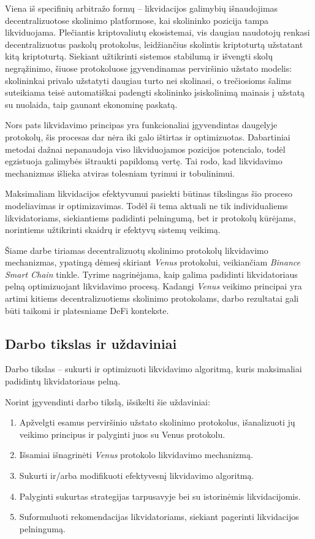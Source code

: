 \documentclass[]{VUMIFTemplateClass}
\begin{document}
Viena iš specifinių arbitražo formų – likvidacijos galimybių išnaudojimas decentralizuotose skolinimo platformose, kai skolininko pozicija tampa likviduojama. Plečiantis kriptovaliutų ekosistemai, vis daugiau naudotojų renkasi decentralizuotus paskolų protokolus, leidžiančius skolintis kriptoturtą užstatant kitą kriptoturtą. Siekiant užtikrinti sistemos stabilumą ir išvengti skolų negrąžinimo, šiuose protokoluose įgyvendinamas perviršinio užstato modelis: skolininkai privalo užstatyti daugiau turto nei skolinasi, o trečiosioms šalims suteikiama teisė automatiškai padengti skolininko įsiskolinimą mainais į užstatą su nuolaida, taip gaunant ekonominę paskatą.

Nors pats likvidavimo principas yra funkcionaliai įgyvendintas daugelyje protokolų, šis procesas dar nėra iki galo ištirtas ir optimizuotas. Dabartiniai metodai dažnai nepanaudoja viso likviduojamos pozicijos potencialo, todėl egzistuoja galimybės ištraukti papildomą vertę. Tai rodo, kad likvidavimo mechanizmas išlieka atviras tolesniam tyrimui ir tobulinimui.

Maksimaliam likvidacijos efektyvumui pasiekti būtinas tikslingas šio proceso modeliavimas ir optimizavimas. Todėl ši tema aktuali ne tik individualiems likvidatoriams, siekiantiems padidinti pelningumą, bet ir protokolų kūrėjams, norintiems užtikrinti skaidrų ir efektyvų sistemų veikimą.

Šiame darbe tiriamas decentralizuotų skolinimo protokolų likvidavimo mechanizmas, ypatingą dėmesį skiriant \textit{Venus} protokolui, veikiančiam \textit{Binance Smart Chain} tinkle. Tyrime nagrinėjama, kaip galima padidinti likvidatoriaus pelną optimizuojant likvidavimo procesą. Kadangi \textit{Venus} veikimo principai yra artimi kitiems decentralizuotiems skolinimo protokolams, darbo rezultatai gali būti taikomi ir platesniame DeFi kontekste.

\subsection*{Darbo tikslas ir uždaviniai}
Darbo tikslas – sukurti ir optimizuoti likvidavimo algoritmą, kuris maksimaliai padidintų likvidatoriaus pelną.

Norint įgyvendinti darbo tikslą, išsikelti šie uždaviniai:
\begin{enumerate}
    \item Apžvelgti esamus perviršinio užstato skolinimo protokolus, išanalizuoti jų veikimo principus ir palyginti juos su Venus protokolu.
    \item Išsamiai išnagrinėti \textit{Venus} protokolo likvidavimo mechanizmą.
    \item Sukurti ir/arba modifikuoti efektyvesnį likvidavimo algoritmą.
    \item Palyginti sukurtas strategijas tarpusavyje bei su istorinėmis likvidacijomis.
    \item Suformuluoti rekomendacijas likvidatoriams, siekiant pagerinti likvidacijos pelningumą.
\end{enumerate}
\end{document}
